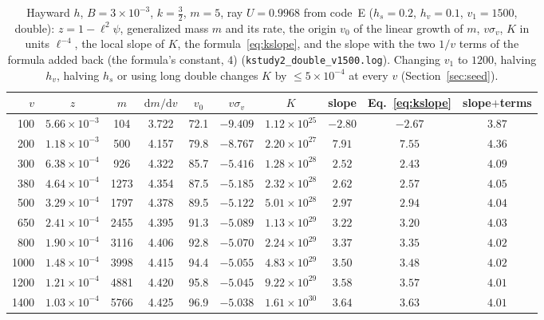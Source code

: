 \documentclass[11pt]{article}
\begin{document}
\begin{table}[ht]\centering\small
\caption{Hayward $h$, $B=3\times10^{-3}$, $k=\tfrac32$, $m=5$, ray $U=0.9968$ from code~E ($h_s=0.2$, $h_v=0.1$, $v_1=1500$, double): $z=1-\ell^{2}\psi$, generalized mass $m$ and its rate, the origin $v_0$ of the linear growth of $m$, $v\sigma_v$, $K$ in units $\ell^{-4}$, the local slope of $K$, the formula~\eqref{eq:kslope}, and the slope with the two $1/v$ terms of the formula added back (the formula's constant, $4$) (\texttt{kstudy2\_double\_v1500.log}). Changing $v_1$ to $1200$, halving $h_v$, halving $h_s$ or using long double changes $K$ by $\le5\times10^{-4}$ at every $v$ (Section~\ref{sec:seed}).}\label{tab:k650}
\begin{tabular}{rccccccccc}
\toprule
$v$ & $z$ & $m$ & $\mathrm dm/\mathrm dv$ & $v_0$ & $v\sigma_v$ & $K$ & slope & Eq.~\eqref{eq:kslope} & slope$+$terms\\\midrule
100 & $5.66\!\times\!10^{-3}$ & 104 & 3.722 & 72.1 & $-9.409$ & $1.12\!\times\!10^{25}$ & $-2.80$ & $-2.67$ & $3.87$\\
200 & $1.18\!\times\!10^{-3}$ & 500 & 4.157 & 79.8 & $-8.767$ & $2.20\!\times\!10^{27}$ & $7.91$ & $7.55$ & $4.36$\\
300 & $6.38\!\times\!10^{-4}$ & 926 & 4.322 & 85.7 & $-5.416$ & $1.28\!\times\!10^{28}$ & $2.52$ & $2.43$ & $4.09$\\
380 & $4.64\!\times\!10^{-4}$ & 1273 & 4.354 & 87.5 & $-5.185$ & $2.32\!\times\!10^{28}$ & $2.62$ & $2.57$ & $4.05$\\
500 & $3.29\!\times\!10^{-4}$ & 1797 & 4.378 & 89.5 & $-5.122$ & $5.01\!\times\!10^{28}$ & $2.97$ & $2.94$ & $4.04$\\
650 & $2.41\!\times\!10^{-4}$ & 2455 & 4.395 & 91.3 & $-5.089$ & $1.13\!\times\!10^{29}$ & $3.22$ & $3.20$ & $4.03$\\
800 & $1.90\!\times\!10^{-4}$ & 3116 & 4.406 & 92.8 & $-5.070$ & $2.24\!\times\!10^{29}$ & $3.37$ & $3.35$ & $4.02$\\
1000 & $1.48\!\times\!10^{-4}$ & 3998 & 4.415 & 94.4 & $-5.055$ & $4.83\!\times\!10^{29}$ & $3.50$ & $3.48$ & $4.02$\\
1200 & $1.21\!\times\!10^{-4}$ & 4881 & 4.420 & 95.8 & $-5.045$ & $9.22\!\times\!10^{29}$ & $3.58$ & $3.57$ & $4.01$\\
1400 & $1.03\!\times\!10^{-4}$ & 5766 & 4.425 & 96.9 & $-5.038$ & $1.61\!\times\!10^{30}$ & $3.64$ & $3.63$ & $4.01$\\\bottomrule
\end{tabular}
\end{table}
\end{document}
